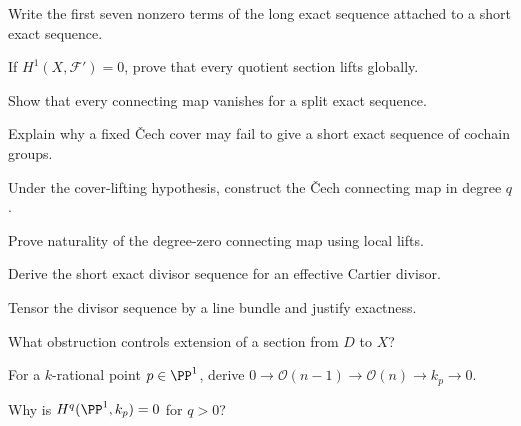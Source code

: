 \begin{exercise}\label{exr:vi48-07}
Write the first seven nonzero terms of the long exact sequence attached to a short exact sequence.
\end{exercise}

\begin{exercise}\label{exr:vi48-08}
If $H^1(X,\mathcal F')=0$, prove that every quotient section lifts globally.
\end{exercise}

\begin{exercise}\label{exr:vi48-09}
Show that every connecting map vanishes for a split exact sequence.
\end{exercise}

\begin{exercise}\label{exr:vi48-10}
Explain why a fixed \v{C}ech cover may fail to give a short exact sequence of cochain groups.
\end{exercise}

\begin{exercise}\label{exr:vi48-11}
Under the cover-lifting hypothesis, construct the \v{C}ech connecting map in degree $q$.
\end{exercise}

\begin{exercise}\label{exr:vi48-12}
Prove naturality of the degree-zero connecting map using local lifts.
\end{exercise}

\begin{exercise}\label{exr:vi48-13}
Derive the short exact divisor sequence for an effective Cartier divisor.
\end{exercise}

\begin{exercise}\label{exr:vi48-14}
Tensor the divisor sequence by a line bundle and justify exactness.
\end{exercise}

\begin{exercise}\label{exr:vi48-15}
What obstruction controls extension of a section from $D$ to $X$?
\end{exercise}

\begin{exercise}\label{exr:vi48-16}
For a $k$-rational point $p\in\PP^1$, derive $0\to\mathcal O(n-1)\to\mathcal O(n)\to k_p\to0$.
\end{exercise}

\begin{exercise}\label{exr:vi48-17}
Why is $H^q(\PP^1,k_p)=0$ for $q>0$?
\end{exercise}

